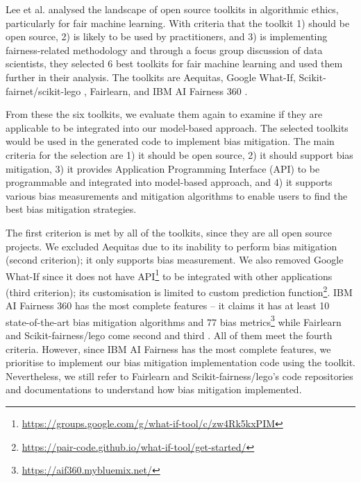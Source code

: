\documentclass[sigconf,review]{acmart}
\begin{document}
Lee et al. \cite{lee2021landscape} analysed the landscape of open source toolkits in algorithmic ethics, particularly for fair machine learning. With criteria that the toolkit 1) should be open source, 2) is likely to be used by practitioners, and 3) is implementing fairness-related methodology and through a focus group discussion of data scientists, they selected 6 best toolkits for fair machine learning and used them further in their analysis. The toolkits are Aequitas\cite{saleiro2019aequitas}, Google What-If\cite{googlewhatif2020}, Scikit-fairnet/scikit-lego \cite{scikitfairness2022,scikitlego2022}, Fairlearn\cite{bird2020fairlearn}, and IBM AI Fairness 360 \cite{bellamy2018ai}.  

From these the six toolkits, we evaluate them again to examine if they are applicable to be integrated into our model-based approach. The selected toolkits would be used in the generated code to implement bias mitigation. The main criteria for the selection are 1) it should be open source, 2) it should support bias mitigation, 3) it provides Application Programming Interface (API) to be programmable and integrated into model-based approach, and 4) it supports various bias measurements and mitigation algorithms to enable users to find the best bias mitigation strategies. 

The first criterion is met by all of the toolkits, since they are all open source projects. We excluded Aequitas due to its inability to perform bias mitigation (second criterion); it only supports bias measurement. We also removed Google What-If since it does not have API\footnote{\url{https://groups.google.com/g/what-if-tool/c/zw4Rk5kxPIM}} to be integrated with other applications (third criterion); its customisation is limited to custom prediction function\footnote{\url{https://pair-code.github.io/what-if-tool/get-started/}}. IBM AI Fairness 360 has the most complete features -- it claims it has at least 10 state-of-the-art bias mitigation algorithms and 77 bias metrics\footnote{\url{https://aif360.mybluemix.net/}} while Fairlearn and Scikit-fairness/lego come second and third \cite{lee2021landscape}. All of them meet the fourth criteria. However, since IBM AI Fairness has the most complete features, we prioritise to implement our bias mitigation implementation code using the toolkit. Nevertheless, we still refer to Fairlearn and Scikit-fairness/lego's code repositories and documentations to understand how bias mitigation implemented. 

\end{document}
